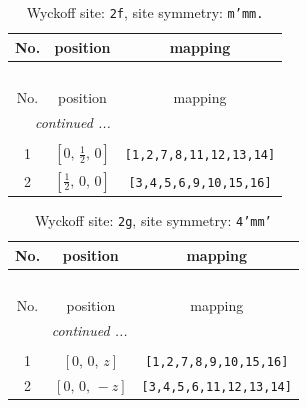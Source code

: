 \documentclass[fleqn,8pt]{jsarticle}
\begin{document}
\renewcommand{\arraystretch}{1.2}
\begin{longtable}{ccc}
\caption{Wyckoff site: {\tt 2f}, site symmetry: {\tt m'mm.}}
 \\
 \hline \hline
No. & position & mapping \\ \hline \endfirsthead

\multicolumn{2}{l}{\tablename\ \thetable{}} \\
 \hline \hline
No. & position & mapping \\ \hline \endhead

 \hline \hline
\multicolumn{2}{r}{\footnotesize\it continued ...} \\ \endfoot

 \hline \hline
\multicolumn{2}{r}{} \\ \endlastfoot

1 & $\left[ 0,\, \frac{1}{2},\, 0 \right]$ & {\tt [1,2,7,8,11,12,13,14]} \\ \hline
2 & $\left[ \frac{1}{2},\, 0,\, 0 \right]$ & {\tt [3,4,5,6,9,10,15,16]} \\
\end{longtable}
\renewcommand{\arraystretch}{1.2}
\begin{longtable}{ccc}
\caption{Wyckoff site: {\tt 2g}, site symmetry: {\tt 4'mm'}}
 \\
 \hline \hline
No. & position & mapping \\ \hline \endfirsthead

\multicolumn{2}{l}{\tablename\ \thetable{}} \\
 \hline \hline
No. & position & mapping \\ \hline \endhead

 \hline \hline
\multicolumn{2}{r}{\footnotesize\it continued ...} \\ \endfoot

 \hline \hline
\multicolumn{2}{r}{} \\ \endlastfoot

1 & $\left[ 0,\, 0,\, z \right]$ & {\tt [1,2,7,8,9,10,15,16]} \\ \hline
2 & $\left[ 0,\, 0,\, - z \right]$ & {\tt [3,4,5,6,11,12,13,14]} \\
\end{longtable}
\renewcommand{\arraystretch}{1.2}
\end{document}
